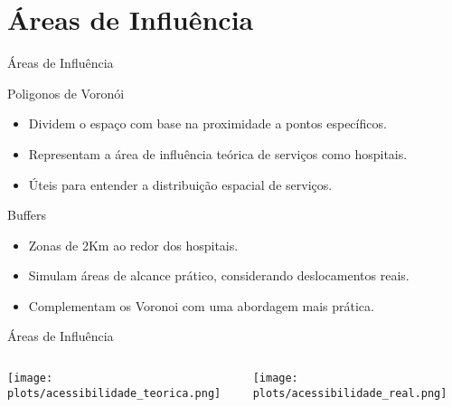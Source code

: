 \documentclass{beamer}
\begin{document}
\section{Áreas de Influência}

\begin{frame}{Áreas de Influência}
          \begin{block}{Poligonos de Voronói}
            \begin{itemize}
              \item Dividem o espaço com base na proximidade a pontos específicos.
              \item Representam a área de influência teórica de serviços como hospitais.
              \item Úteis para entender a distribuição espacial de serviços.
            \end{itemize}
          \end{block}
 
          \begin{block}{Buffers}
            \begin{itemize}
              \item Zonas de 2Km ao redor dos hospitais.
              \item Simulam áreas de alcance prático, considerando deslocamentos reais.
              \item Complementam os Voronoi com uma abordagem mais prática.
            \end{itemize}   
          \end{block}

\end{frame}

\begin{frame}{Áreas de Influência}
    \begin{columns}
        \begin{column}{0.5\textwidth}
            \centering
            \texttt{[image: plots/acessibilidade\_teorica.png]} 
        \end{column}

        \begin{column}{0.5\textwidth}
            \centering
            \texttt{[image: plots/acessibilidade\_real.png]} 
        \end{column}
    \end{columns}
\end{frame}
\end{document}
